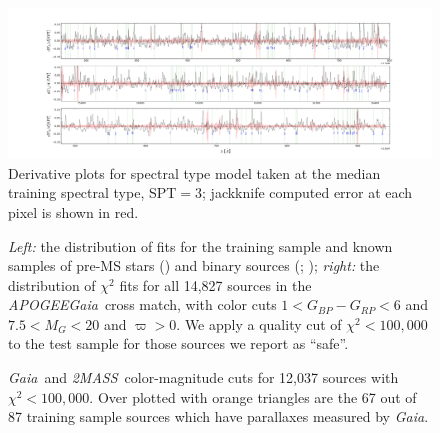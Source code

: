 \documentclass[modern]{aastex62}
\newcommand{\apogee}{\textsl{APOGEE}}
\newcommand{\gaia}{\textsl{Gaia}}
\newcommand{\zmass}{\textsl{2MASS}}
\begin{document}
\begin{figure}[ht]
\begin{center}
\includegraphics[width=16cm]{figures/derivative_jackknife_spt.png}
\end{center}
\caption{Derivative plots for spectral type model taken at the median training spectral type, SPT$=3$; jackknife computed error at each pixel is shown in red.} \label{fig:west_derivative}
\end{figure}

\begin{figure}[ht]
\caption{\textit{Left:} the distribution of fits for the training sample and known samples of pre-MS stars (\citealt{Cottaar:2014}) and binary sources (\citealt{ElBadry:2018}; \citealt{Skinner:2018}); \textit{right:} the distribution of $\chi^2$ fits for all 14,827 sources in the \apogee\-\gaia\ cross match, with color cuts $1<G_{BP}-G_{RP}<6$ and $7.5<M_{G}<20$ and $\varpi>0$. We apply a quality cut of $\chi^2 < 100,000$ to the test sample for those sources we report as ``safe''. \label{fig:chi_dist}}
\end{figure}

\begin{figure}[ht]
\caption{\gaia\ and \zmass\ color-magnitude cuts for 12,037 sources with $\chi^2<100,000$. Over plotted with orange triangles are the 67 out of 87 training sample sources which have parallaxes measured by \gaia. \label{fig:cmd_selection}}
\end{figure}
\end{document}
